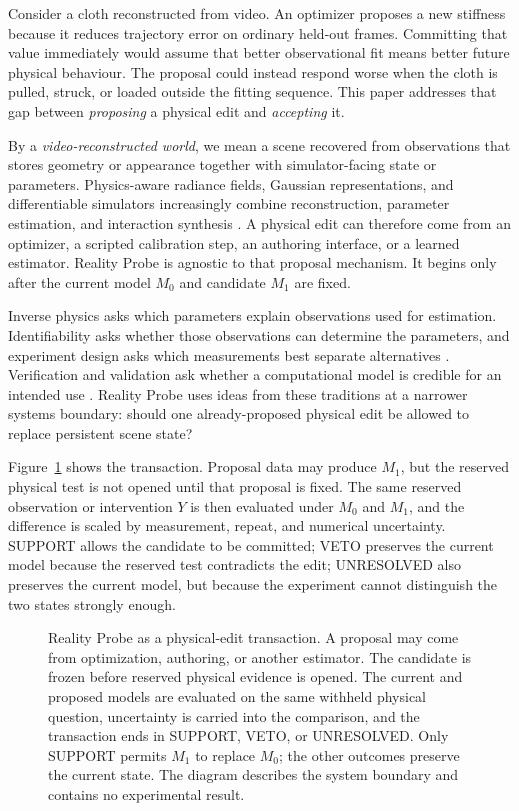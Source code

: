 \documentclass[acmtog]{acmart}
\begin{document}
Consider a cloth reconstructed from video. An optimizer proposes a new stiffness because it reduces trajectory error on ordinary held-out frames. Committing that value immediately would assume that better observational fit means better future physical behaviour. The proposal could instead respond worse when the cloth is pulled, struck, or loaded outside the fitting sequence. This paper addresses that gap between \emph{proposing} a physical edit and \emph{accepting} it.

By a \emph{video-reconstructed world}, we mean a scene recovered from observations that stores geometry or appearance together with simulator-facing state or parameters. Physics-aware radiance fields, Gaussian representations, and differentiable simulators increasingly combine reconstruction, parameter estimation, and interaction synthesis \citep{li2023pacnerf,xie2024physgaussian,zhang2024physdreamer,liu2025physflow,rho2026monophysics,wada2026mphygs,hu2019chainqueen,hu2020difftaichi}. A physical edit can therefore come from an optimizer, a scripted calibration step, an authoring interface, or a learned estimator. Reality Probe is agnostic to that proposal mechanism. It begins only after the current model $M_0$ and candidate $M_1$ are fixed.

Inverse physics asks which parameters explain observations used for estimation. Identifiability asks whether those observations can determine the parameters, and experiment design asks which measurements best separate alternatives \citep{wang2026identifiability,asadi2025oed}. Verification and validation ask whether a computational model is credible for an intended use \citep{oberkampf2007pcmm,laudy2026digitaltwin}. Reality Probe uses ideas from these traditions at a narrower systems boundary: should one already-proposed physical edit be allowed to replace persistent scene state?

Figure~\ref{fig:overview} shows the transaction. Proposal data may produce $M_1$, but the reserved physical test is not opened until that proposal is fixed. The same reserved observation or intervention $Y$ is then evaluated under $M_0$ and $M_1$, and the difference is scaled by measurement, repeat, and numerical uncertainty. SUPPORT allows the candidate to be committed; VETO preserves the current model because the reserved test contradicts the edit; UNRESOLVED also preserves the current model, but because the experiment cannot distinguish the two states strongly enough.

\begin{figure}[t]
\centering
\resizebox{0.98\textwidth}{!}{}
\caption{Reality Probe as a physical-edit transaction. A proposal may come from optimization, authoring, or another estimator. The candidate is frozen before reserved physical evidence is opened. The current and proposed models are evaluated on the same withheld physical question, uncertainty is carried into the comparison, and the transaction ends in SUPPORT, VETO, or UNRESOLVED. Only SUPPORT permits $M_1$ to replace $M_0$; the other outcomes preserve the current state. The diagram describes the system boundary and contains no experimental result.}
\label{fig:overview}
\end{figure}
\end{document}
